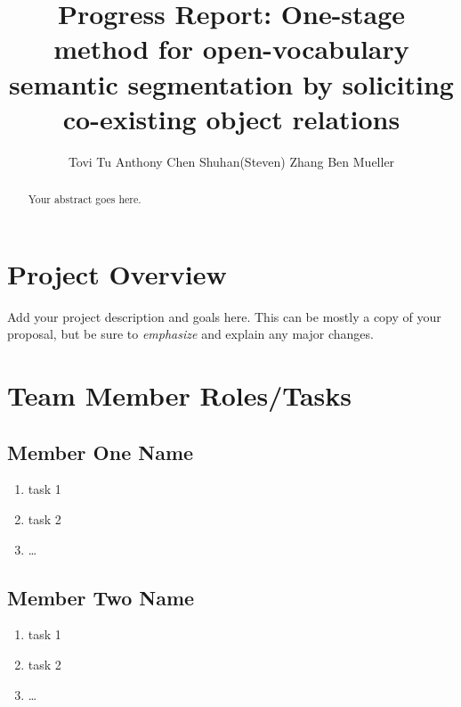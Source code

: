 \documentclass[10pt,twocolumn,letterpaper]{article}
\begin{document}
\title{Progress Report: One-stage method for open-vocabulary semantic segmentation by soliciting co-existing object relations}

\author{
Tovi Tu \hspace{1in} Anthony Chen \hspace{1in} Shuhan(Steven) Zhang  \hspace{1in} Ben Mueller 
}
\maketitle

\begin{abstract}
  Your abstract goes here.
\end{abstract}

\section{Project Overview}

Add your project description and goals here. This can be mostly a copy of your proposal, but be sure to \emph{emphasize} and explain any major changes.

\section{Team Member Roles/Tasks}
\label{sec:roles}

\subsection{Member One Name}

\begin{enumerate}

\item task 1
\item task 2
\item \ldots

\end{enumerate}

\subsection{Member Two Name}

\begin{enumerate}

\item task 1
\item task 2
\item \ldots

\end{enumerate}
\end{document}
